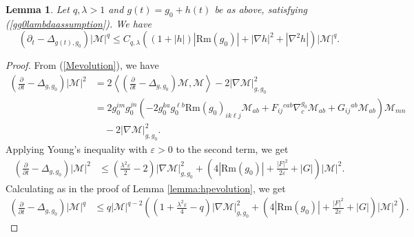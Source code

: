 \documentclass[12pt]{amsart}
\newcommand{\calM}{\mathcal{M}}
\newcommand{\LA}{\left\langle}
\newcommand{\RA}{\right\rangle}
\newcommand{\p}{{ \partial}}
\renewcommand{\1}{{\mathbf 1}}
\newcommand{\Rm}{\mathrm{Rm}}
\renewcommand{\p}{{\partial}}
\newcommand{\eps}{{\varepsilon}}
\newtheorem{lemma}[thm]{Lemma}
\theoremstyle{others}
\numberwithin{equation}{section}
\begin{document}
\begin{lemma}\label{Mpevolution} Let $q, \lambda > 1$ and $g(t) = g_0 + h(t)$ be as above, satisfying (\ref{gg0lambdaassumption}). We have
        \begin{equation}\label{evolutionof|M|^q}
        \left( \partial_t - \Delta_{g(t),g_0} \right) |\calM|^{q} \leq  C_{q, \lambda} \left( \left( 1 + |h| \right) |\Rm(g_0)| + |\nabla h|^2 + |\nabla^2 h| \right) |\calM|^{q} .
    \end{equation}
\end{lemma}
\begin{proof}
From (\ref{Mevolution}), we have
   \begin{equation}
       \begin{split}
           \left( \frac{\p}{\p t} - \Delta_{g, g_0} \right) |\calM|^2 & = 2 \LA \left( \frac{\p}{\p t} - \Delta_{g, g_0} \right) \calM , \calM \RA - 2 |\nabla \calM |_{g,g_0}^2 \\
           & = 2 g_0^{im} g_0^{jn}\left( -2  g_0^{ka}g_0^{\ell b} \Rm(g_0)_{ik\ell j} \mathcal{M}_{ab} + F_{ij}{}^{cab} \nabla^{g_0}_c \mathcal{M}_{ab} + G_{ij}{}^{ab} \mathcal{M}_{ab} \right) \calM_{mn} \\
           & \quad - 2 |\nabla \calM|_{g,g_0}^2.
       \end{split}
   \end{equation}
   Applying Young's inequality with $\eps > 0$ to the second term, we get
      \begin{equation}
       \begin{split}
           \left( \frac{\p}{\p t} - \Delta_{g, g_0} \right) |\calM|^2 
           & \leq \left( \frac{\lambda^2 \eps}{2} - 2 \right) |\nabla \calM|_{g,g_0}^2 + \left( 4 |\Rm (g_0)| + \frac{|F|^2}{2 \eps} + |G| \right) |\calM|^2.
       \end{split}
   \end{equation}
   Calculating as in the proof of Lemma \ref{lemma:hpevolution}, we get
         \begin{equation}
       \begin{split}
           \left( \frac{\p}{\p t} - \Delta_{g, g_0} \right) |\calM|^q 
           & \leq q |\calM|^{q-2} \left( \left( 1 + \frac{\lambda^2 \eps}{4} - q \right) |\nabla \calM|_{g,g_0}^2 + \left( 4 |\Rm (g_0)| + \frac{|F|^2}{2 \eps} + |G| \right) |\calM|^2 \right).

\end{split}
\end{equation}
\end{proof}
\end{document}
